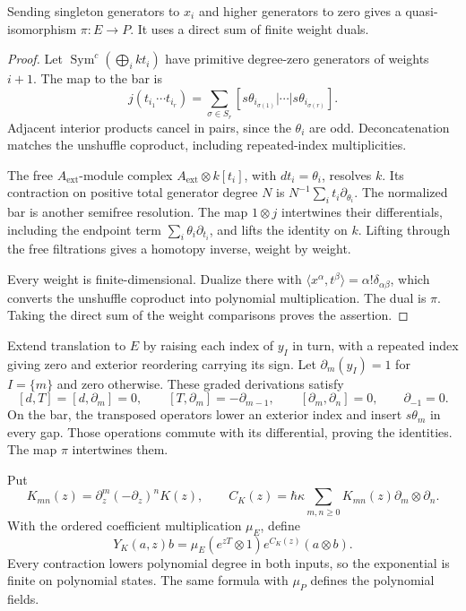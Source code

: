 \begin{lemma}
\label{v4-arith:centers:lem:field-resolution}
Sending singleton generators to $x_i$ and higher generators
to zero gives a quasi-isomorphism $\pi:E\to P$.
It uses a direct sum of finite weight duals.
\end{lemma}

\begin{proof}
Let $\operatorname{Sym}^c(\bigoplus_i kt_i)$ have primitive
degree-zero generators of weights $i+1$. The map to the bar is
\[
 j(t_{i_1}\cdots t_{i_r})
 =\sum_{\sigma\in S_r}
 [s\theta_{i_{\sigma(1)}}|\cdots|s\theta_{i_{\sigma(r)}}].
\]
Adjacent interior products cancel in pairs, since the
$\theta_i$ are odd. Deconcatenation matches the unshuffle
coproduct, including repeated-index multiplicities.

The free $A_{\mathrm{ext}}$-module complex
$A_{\mathrm{ext}}\otimes k[t_i]$, with $dt_i=\theta_i$,
resolves $k$. Its contraction on positive total generator
degree $N$ is $N^{-1}\sum_i t_i\partial_{\theta_i}$.
The normalized bar is another semifree resolution.
The map $1\otimes j$ intertwines their differentials,
including the endpoint term $\sum_i\theta_i\partial_{t_i}$,
and lifts the identity on $k$. Lifting through the free
filtrations gives a homotopy inverse, weight by weight.

Every weight is finite-dimensional. Dualize there with
$\langle x^\alpha,t^\beta\rangle=\alpha!\delta_{\alpha\beta}$,
which converts the unshuffle coproduct into polynomial
multiplication. The dual is $\pi$. Taking the direct sum
of the weight comparisons proves the assertion.
\end{proof}

Extend translation to $E$ by raising each index of $y_I$
in turn, with a repeated index giving zero and exterior
reordering carrying its sign. Let
$\partial_m(y_I)=1$ for $I=\{m\}$ and zero otherwise.
These graded derivations satisfy
\[
 [d,T]=[d,\partial_m]=0,\qquad
 [T,\partial_m]=-\partial_{m-1},\qquad
 [\partial_m,\partial_n]=0,\qquad\partial_{-1}=0.
\]
On the bar, the transposed operators lower an exterior
index and insert $s\theta_m$ in every gap.
Those operations commute with its differential, proving
the identities. The map $\pi$ intertwines them.

Put
\[
 K_{mn}(z)=\partial_z^m(-\partial_z)^nK(z),\qquad
 C_K(z)=\hbar\kappa\sum_{m,n\geq0}
 K_{mn}(z)\partial_m\otimes\partial_n.
\]
With the ordered coefficient multiplication $\mu_E$, define
\[
 Y_K(a,z)b=\mu_E(e^{zT}\otimes1)e^{C_K(z)}(a\otimes b).
\]
Every contraction lowers polynomial degree in both inputs,
so the exponential is finite on polynomial states.
The same formula with $\mu_P$ defines the polynomial fields.

